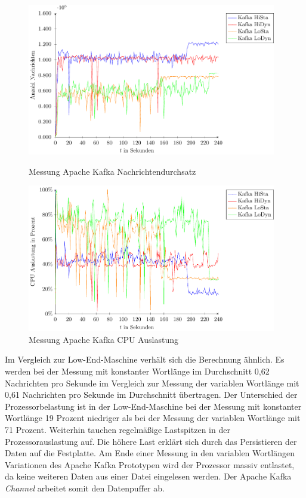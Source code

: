 \begin{figure}[!ht]
\includegraphics[width=0.97\textwidth]{plots/messungKafkaDurchsatz.pdf}
\caption{Messung Apache Kafka Nachrichtendurchsatz
\label{fig:messungKafkaNd}}
\includegraphics[width=0.97\textwidth]{plots/messungKafkaCpu.pdf}
\caption{Messung Apache Kafka CPU Auslastung
\label{fig:messungKafkaCpu}}
\end{figure}


Im Vergleich zur Low-End-Maschine verhält sich die Berechnung ähnlich. Es werden bei der Messung mit konstanter Wortlänge im Durchschnitt 0,62 Nachrichten pro Sekunde im Vergleich zur Messung der variablen Wortlänge mit 0,61 Nachrichten pro Sekunde im Durchschnitt übertragen. Der Unterschied der Prozessorbelastung ist in der Low-End-Maschine bei der Messung mit konstanter Wortlänge 19 Prozent niedriger als bei der Messung der variablen Wortlänge mit 71 Prozent. Weiterhin tauchen regelmäßige Lastspitzen in der Prozessorauslastung auf. Die höhere Last erklärt sich durch das Persistieren der Daten auf die Festplatte. Am Ende einer Messung in den variablen Wortlängen Variationen des Apache Kafka Prototypen wird der Prozessor massiv entlastet, da keine weiteren Daten aus einer Datei eingelesen werden. Der Apache Kafka \textit{Channel} arbeitet somit den Datenpuffer ab.


